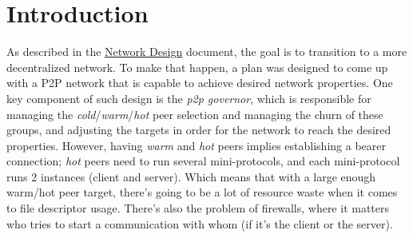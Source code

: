 \def\NewInboundConnection{\textsf{NewConnection Inbound}}
\def\NewOutboundConnection{\textsf{NewConnection Outbound}}
\def\NewConnectionAny{\textsf{NewConnection provenance}}
\def\AwakeRemote{\textsf{AwakeRemote}}
\def\RemoteToCold{\textsf{RemoteToCold}}
\def\CommitRemote{\textsf{CommitRemote}}

\def\cold{\textit{cold}}
\def\warm{\textit{warm}}
\def\hot{\textit{hot}}
\def\established{\textit{established}}

\def\keepAlive{\textsf{keep-alive}}
\def\tipSample{\textsf{tip-sample}}

\def\ptopgov{\textit{p2p governor}}
\def\mux{\textit{mux}}
\def\inbgov{\textit{inbound protocol governor}}
\def\Inbgov{\textit{Inbound protocol governor}}
\def\connmngr{\textit{connection manager}}
\def\Connmngr{\textit{Connection manager}}
\def\True{\texttt{True}}
\def\False{\texttt{False}}


\newcommand{\todoimpl}[1]{\todo[backgroundcolor=red,linecolor=red]{#1}}
\newenvironment{detail}
  {
    \begin{center}
    \begin{minipage}{0.9\textwidth}
      \begin{shaded}
      \small
      \noindent Implementation detail
      \vspace{0.3em}
      \newline
      \itshape
  }
  {
  \end{shaded}
  \end{minipage}
  \end{center}
  \vspace{1em}
  }

\section{Introduction}

As described in the \href{https://hydra.iohk.io/build/5866649/download/1/network-design.pdf}{Network Design} document, the goal is to transition to a more
decentralized network. To make that happen, a plan was designed to come up with a P2P
network that is capable to achieve desired network properties. One key component of
such design is the \ptopgov{}, which is responsible for managing the \cold{}/\warm{}/\hot{}
peer selection and managing the churn of these groups, and adjusting the targets in order for
the network to reach the desired properties. However, having \warm{} and \hot{} peers implies
establishing a bearer connection; \hot{} peers need to run several mini-protocols, and each
mini-protocol runs 2 instances (client and server). Which means that with a large enough
warm/hot peer target, there's going to be a lot of resource waste when it comes to file
descriptor usage. There's also the problem of firewalls, where it matters who tries to
start a communication with whom (if it's the client or the server).


